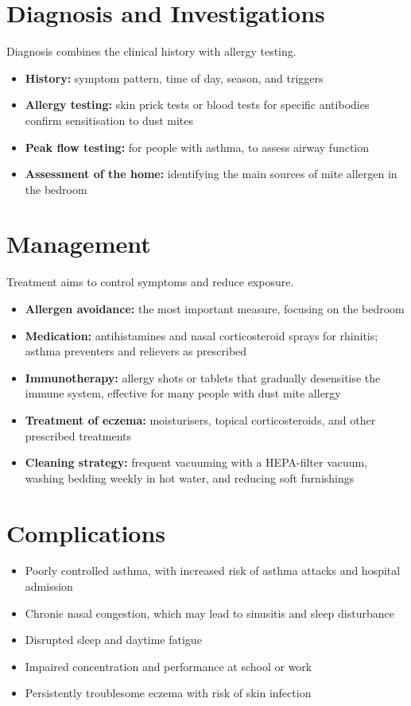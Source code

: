 \section*{Diagnosis and Investigations}
Diagnosis combines the clinical history with allergy testing.
\begin{itemize}
    \item \textbf{History:} symptom pattern, time of day, season, and triggers
    \item \textbf{Allergy testing:} skin prick tests or blood tests for specific antibodies confirm sensitisation to dust mites
    \item \textbf{Peak flow testing:} for people with asthma, to assess airway function
    \item \textbf{Assessment of the home:} identifying the main sources of mite allergen in the bedroom
\end{itemize}

\section*{Management}
Treatment aims to control symptoms and reduce exposure.
\begin{itemize}
    \item \textbf{Allergen avoidance:} the most important measure, focusing on the bedroom
    \item \textbf{Medication:} antihistamines and nasal corticosteroid sprays for rhinitis; asthma preventers and relievers as prescribed
    \item \textbf{Immunotherapy:} allergy shots or tablets that gradually desensitise the immune system, effective for many people with dust mite allergy
    \item \textbf{Treatment of eczema:} moisturisers, topical corticosteroids, and other prescribed treatments
    \item \textbf{Cleaning strategy:} frequent vacuuming with a HEPA-filter vacuum, washing bedding weekly in hot water, and reducing soft furnishings
\end{itemize}

\section*{Complications}
\begin{itemize}
    \item Poorly controlled asthma, with increased risk of asthma attacks and hospital admission
    \item Chronic nasal congestion, which may lead to sinusitis and sleep disturbance
    \item Disrupted sleep and daytime fatigue
    \item Impaired concentration and performance at school or work
    \item Persistently troublesome eczema with risk of skin infection
\end{itemize}

